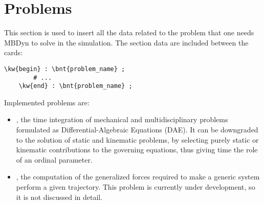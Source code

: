%
%
%
%
%
% 
%
%

\chapter{Problems}\label{sec:PROBLEMS}
This section is used to insert all the data related to the problem that
one needs MBDyn to solve in the simulation.
The section data are included between the cards:
\begin{Verbatim}[commandchars=\\\{\}]
    \kw{begin} : \bnt{problem_name} ;
        # ...
    \kw{end} : \bnt{problem_name} ;
\end{Verbatim}

Implemented problems are:
\begin{itemize}
\item {}, the time integration of mechanical
and multidisciplinary problems formulated
as Differential-Algebraic Equations (DAE).
It can be downgraded to the solution of static and kinematic problems,
by selecting purely static or kinematic contributions
to the governing equations, thus giving time the role
of an ordinal parameter.

\item {}, the computation of the generalized forces
required to make a generic system perform a given trajectory.
This problem is currently under development, so it is not discussed
in detail.

\end{itemize}





